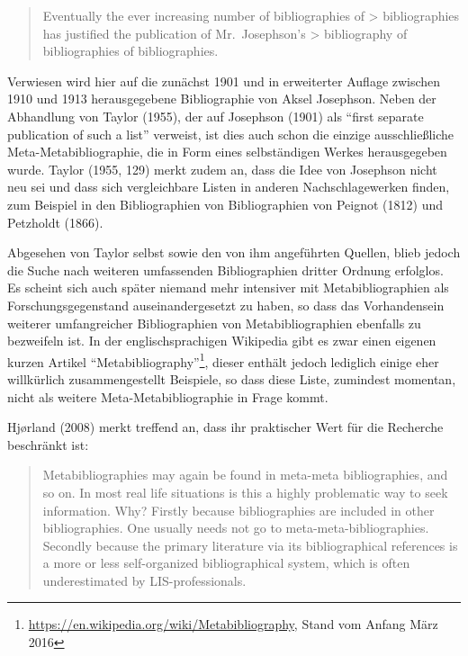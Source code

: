 \documentclass[a4paper,
fontsize=11pt,
oneside,
numbers=noperiodatend,
parskip=half-,
bibliography=totoc,
final
]{scrartcl}
\begin{document}
\begin{quote}
Eventually the ever increasing number of bibliographies of
\textgreater{} bibliographies has justified the publication of
Mr.~Josephson's \textgreater{} bibliography of bibliographies of
bibliographies.
\end{quote}

Verwiesen wird hier auf die zunächst 1901 und in erweiterter Auflage
zwischen 1910 und 1913 herausgegebene Bibliographie von Aksel Josephson.
Neben der Abhandlung von Taylor (1955), der auf Josephson (1901) als
\enquote{first separate publication of such a list} verweist, ist dies
auch schon die einzige ausschließliche Meta-Metabibliographie, die in
Form eines selbständigen Werkes herausgegeben wurde. Taylor (1955, 129)
merkt zudem an, dass die Idee von Josephson nicht neu sei und dass sich
vergleichbare Listen in anderen Nachschlagewerken finden, zum Beispiel
in den Bibliographien von Bibliographien von Peignot (1812) und
Petzholdt (1866).

Abgesehen von Taylor selbst sowie den von ihm angeführten Quellen, blieb
jedoch die Suche nach weiteren umfassenden Bibliographien dritter
Ordnung erfolglos. Es scheint sich auch später niemand mehr intensiver
mit Metabibliographien als Forschungsgegenstand auseinandergesetzt zu
haben, so dass das Vorhandensein weiterer umfangreicher Bibliographien
von Metabibliographien ebenfalls zu bezweifeln ist. In der
englischsprachigen Wikipedia gibt es zwar einen eigenen kurzen Artikel
\enquote{Metabibliography}\footnote{\url{https://en.wikipedia.org/wiki/Metabibliography},
  Stand vom Anfang März 2016}, dieser enthält jedoch lediglich einige
eher willkürlich zusammengestellt Beispiele, so dass diese Liste,
zumindest momentan, nicht als weitere Meta-Metabibliographie in Frage
kommt.

Hjørland (2008) merkt treffend an, dass ihr praktischer Wert für die
Recherche beschränkt ist:

\begin{quote}
Metabibliographies may again be found in meta-meta bibliographies, and
so on. In most real life situations is this a highly problematic way to
seek information. Why? Firstly because bibliographies are included in
other bibliographies. One usually needs not go to
meta-meta-bibliographies. Secondly because the primary literature via
its bibliographical references is a more or less self-organized
bibliographical system, which is often underestimated by
LIS-professionals.
\end{quote}
\end{document}
